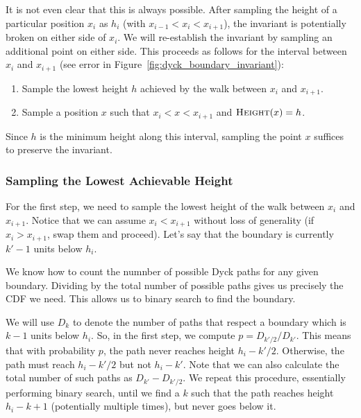 It is not even clear that this is always possible.
After sampling the height of a particular position $x_i$ as $h_i$ (with $x_{i-1} < x_i < x_{i+1}$),
the invariant is potentially broken on either side of $x_i$.
We will re-establish the invariant by sampling an additional point on either side.
This proceeds as follows for the interval between $x_i$ and $x_{i+1}$
(see error in Figure~\ref{fig:dyck_boundary_invariant}):
\begin{enumerate}
    \item Sample the lowest height $h$ achieved by the walk between $x_i$ and $x_{i+1}$.
    \item Sample a position $x$ such that $x_i < x < x_{i+1}$ and $\textsc{Height}(x) = h$.
\end{enumerate}
Since $h$ is the minimum height along this interval, sampling the point $x$ suffices to preserve the invariant.


\subsubsection{Sampling the Lowest Achievable Height}%
\label{ssub:sampling_the_lowest_achievable_height}
For the first step, we need to sample the lowest height of the walk between $x_i$ and $x_{i+1}$.
Notice that we can assume $x_i < x_{i+1}$ without loss of generality (if $x_i > x_{i+1}$, swap them and proceed).
Let's say that the boundary is currently $k'-1$ units below $h_i$.

We know how to count the numnber of possible Dyck paths for any given boundary.
Dividing by the total number of possible paths gives us precisely the CDF we need.
This allows us to binary search to find the boundary.

We will use $D_{k}$ to denote the number of paths that respect a boundary which is $k-1$ units below $h_i$.
So, in the first step, we compute $p = D_{k'/2}/D_{k'}$.
This means that with probability $p$, the path never reaches height $h_i - k'/2$.
Otherwise, the path must reach $h_i-k'/2$ but not $h_i-k'$.
Note that we can also calculate the total number of such paths as $D_{k'} - D_{k'/2}$.
We repeat this procedure, essentially performing binary search,
until we find a $k$ such that the path reaches height $h_i-k+1$ (potentially multiple times), but never goes below it.



